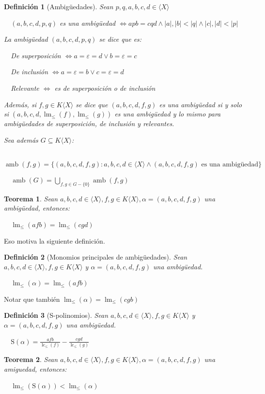\documentclass{amsbook}
\theoremstyle{customstyle}
\newtheorem{definition}{Definición}[section]
\newtheorem{theorem}{Teorema}[section]
\DeclareMathOperator{\lm}{lm}
\DeclareMathOperator{\lc}{lc}
\DeclareMathOperator{\amb}{amb}
\renewcommand{\S}{\text{S}}
\begin{document}
\begin{definition}[Ambigüedades]
Sean $p, q, a, b, c, d ∈ ⟨X⟩$

  $(a, b, c, d, p, q)$ es una ambigüedad $ ⇔ apb = cqd ∧ |a|, |b| < |q| ∧ |c|, |d| < |p|$

La ambigüedad $(a, b, c, d, p, q)$ se dice que es:

  De superposición $⇔ a = ε = d ∨ b = ε = c$

  De inclusión $⇔ a = ε = b ∨ c = ε = d$

  Relevante $⇔$ es de superposición o de inclusión

Además, si $f, g ∈ K⟨X⟩$ se dice que $(a, b, c, d, f, g)$ es una ambigüedad si y solo si $(a, b, c, d, \lm_≤{(f)}, \lm_≤{(g)})$ es una ambigüedad y lo mismo para ambigüedades de superposición, de inclusión y relevantes.

Sea además $G ⊆ K⟨X⟩$:

  $\amb(f, g) = \{(a, b, c, d, f, g) : a, b, c, d ∈ ⟨X⟩ ∧ (a, b, c, d, f, g)\text{ es una ambigüedad}\}$

  $\amb(G) = \bigcup_{f, g ∈ G - \{0\}}{\amb(f, g)}$

\end{definition}

\begin{theorem}
Sean $a, b, c, d ∈ ⟨X⟩, f, g ∈ K⟨X⟩, α = (a, b, c, d, f, g)$ una ambigüedad, entonces:

  $\lm_≤{(afb)} = \lm_≤{(cgd)}$

\end{theorem}


Eso motiva la siguiente definición.

\begin{definition}[Monomios principales de ambigüedades]
Sean $a, b, c, d ∈ ⟨X⟩, f, g ∈ K⟨X⟩$ y $α = (a, b, c, d, f, g)$ una ambigüedad.

  $\lm_≤{(α)} = \lm_≤{(afb)}$
\end{definition}

Notar que también $\lm_≤{(α)} = \lm_≤{(cgb)}$

\begin{definition}[S-polinomios]
Sean $a, b, c, d ∈ ⟨X⟩, f, g ∈ K⟨X⟩$ y $α = (a, b, c, d, f, g)$ una ambigüedad.

  $\S(α) = \frac{afb}{\lc_≤{(f)}} - \frac{cgd}{\lc_≤{(g)}}$
\end{definition}

\begin{theorem}
Sean $a, b, c, d ∈ ⟨X⟩, f, g ∈ K⟨X⟩, α = (a, b, c, d, f, g)$ una amiguedad, entonces:

  $\lm_≤{(\S(α))} < \lm_≤{(α)}$

\end{theorem}
\end{document}
